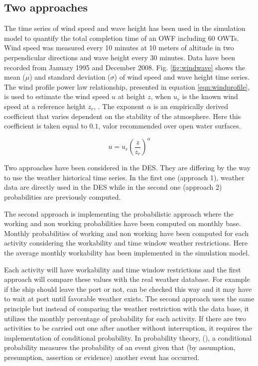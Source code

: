 \subsection{Two approaches}
The time series of wind speed and wave height has been used in the simulation model to quantify the total completion time of an OWF including 60 OWTs. Wind speed was measured every 10 minutes at 10 meters of altitude in two perpendicular directions and wave height every 30 minutes. Data have been recorded from January 1995 and December 2008.
Fig. \ref{fig:windwave} shows the mean ($\mu$) and standard deviation ($\sigma$) of wind speed and wave height time series.
The wind profile power law relationship, presented in equation \ref{eqn:windprofile}, is used to estimate the wind speed $u$ at height $z$, when $u_{r}$ is the known wind speed at a reference height $z_{r}$, \cite{1978Peterson}. The exponent $\alpha$ is an empirically derived coefficient that varies dependent on the stability of the atmosphere. Here this coefficient is taken equal to $0.1$, valor recommended over open water surfaces.

\begin{equation}
\label{eqn:windprofile}
u = u_{r} \left( \frac{z}{z_r} \right)^{\alpha}
\end{equation}

Two approaches have been considered in the DES. They are differing by the way to use the weather historical time series. In the first one (approach 1), weather data are directly used in the DES while in the second one (approach 2) probabilities are previously computed.


The second approach is implementing the probabilistic approach where the working and non working probabilities have been computed on monthly base. Monthly probabilities of working and non working have been computed for each activity considering the workability and time window weather restrictions. Here the average monthly workability has been implemented in the simulation model. 

Each activity will have workability and time window restrictions and the first approach will compare these values with the real weather database. For example if the ship should leave the port or not, can be checked this way and it may have to wait at port until favorable weather exists. The second approach uses the same principle but instead of comparing the weather restriction with the data base, it utilizes the monthly percentage of probability for each activity. If there are two activities to be carried out one after another without interruption, it requires the implementation of conditional probability.  
In probability theory, (\cite{Thalemann2012}), a conditional probability measures the probability of an event given that (by assumption, presumption, assertion or evidence) another event has occurred. 


